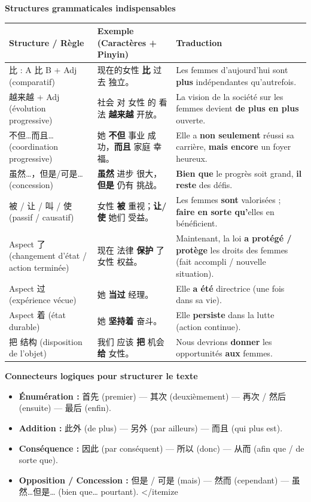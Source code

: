 \documentclass[11pt]{article}
\newcommand{\cle}[1]{{\popxbold\color{popdark}#1}}
\begin{document}
\begin{bilan}
\textbf{Structures grammaticales indispensables}\par
\begin{center}
\begin{tabularx}{\linewidth}{|X|X|X|}
\hline
\rowcolor{poporangeL}
\textbf{Structure / Règle} & \textbf{Exemple (Caractères + Pinyin)} & \textbf{Traduction} \\
\hline
\cle{比} : A 比 B + Adj (comparatif) &
现在的女性 \textbf{比} 过去 独立。 &
Les femmes d'aujourd'hui sont \textbf{plus} indépendantes qu'autrefois. \\
\hline
\cle{越来越} + Adj (évolution progressive) &
社会 对 女性 的 看法 \textbf{越来越} 开放。 &
La vision de la société sur les femmes devient \textbf{de plus en plus} ouverte. \\
\hline
\cle{不但…而且…} (coordination progressive) &
她 \textbf{不但} 事业 成功，\textbf{而且} 家庭 幸福。 &
Elle a \textbf{non seulement} réussi sa carrière, \textbf{mais encore} un foyer heureux. \\
\hline
\cle{虽然…，但是/可是…} (concession) &
\textbf{虽然} 进步 很大，\textbf{但是} 仍有 挑战。 &
\textbf{Bien que} le progrès soit grand, \textbf{il reste} des défis. \\
\hline
\cle{被 / 让 / 叫 / 使} (passif / causatif) &
女性 \textbf{被} 重视；\textbf{让/使} 她们 受益。 &
Les femmes \textbf{sont} valorisées ; \textbf{faire en sorte qu'}elles en bénéficient. \\
\hline
Aspect \cle{了} (changement d'état / action terminée) &
现在 法律 \textbf{保护} 了 女性 权益。 &
Maintenant, la loi \textbf{a protégé / protège} les droits des femmes (fait accompli / nouvelle situation). \\
\hline
Aspect \cle{过} (expérience vécue) &
她 \textbf{当过} 经理。 &
Elle \textbf{a été} directrice (une fois dans sa vie). \\
\hline
Aspect \cle{着} (état durable) &
她 \textbf{坚持着} 奋斗。 &
Elle \textbf{persiste} dans la lutte (action continue). \\
\hline
\cle{把} 结构 (disposition de l'objet) &
我们 应该 \textbf{把} 机会 \textbf{给} 女性。 &
Nous devrions \textbf{donner} les opportunités \textbf{aux} femmes. \\
\hline
\end{tabularx}
\end{center}

\textbf{Connecteurs logiques pour structurer le texte}\par
\begin{itemize}
\item \textbf{Énumération :} 首先 (premier) — 其次 (deuxièmement) — 再次 / 然后 (ensuite) — 最后 (enfin).
\item \textbf{Addition :} 此外 (de plus) — 另外 (par ailleurs) — 而且 (qui plus est).
\item \textbf{Conséquence :} 因此 (par conséquent) — 所以 (donc) — 从而 (afin que / de sorte que).
\item \textbf{Opposition / Concession :} 但是 / 可是 (mais) — 然而 (cependant) — 虽然…但是… (bien que… pourtant).
</{itemize}


\end{itemize}
\end{bilan}
\end{document}
